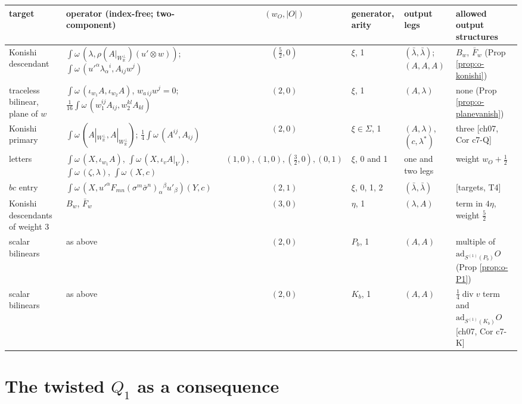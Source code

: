 \begin{tabular}{l|l|c|l|l|l}
target & operator (index-free; two-component) & $(w_O,|O|)$ & generator, arity & output legs & allowed output structures \\
\hline
Konishi descendant & $\int\omega\,(\lambda,\rho(A|_{W_{\mathbb R}^\perp})(u'\otimes w))$; $\int\omega\,(u'^\alpha\lambda_\alpha{}^i,A_{ij}w^j)$ & $(\tfrac52,0)$ & $\xi$, 1 & $(\bar\lambda,\bar\lambda)$; $(A,A,A)$ & $B_w$, $\bar F_w$ (Prop \ref{prop:o-konishi}) \\
traceless bilinear, plane of $w$ & $\int\omega\,(\iota_{w_1}A,\iota_{w_2}A)$, $w_{a\,ij}w^j=0$; $\tfrac1{16}\int\omega\,(w_1^{ij}A_{ij},w_2^{kl}A_{kl})$ & $(2,0)$ & $\xi$, 1 & $(A,\lambda)$ & none (Prop \ref{prop:o-planevanish}) \\
Konishi primary & $\int\omega\,(A|_{W_{\mathbb R}^\perp},A|_{W_{\mathbb R}^\perp})$; $\tfrac14\int\omega\,(A^{ij},A_{ij})$ & $(2,0)$ & $\xi\in\Sigma$, 1 & $(A,\lambda)$, $(c,\lambda^*)$ & three [ch07, Cor c7-Q] \\
letters & $\int\omega\,(X,\iota_{w_1}A)$, $\int\omega\,(X,\iota_vA|_V)$, $\int\omega\,(\zeta,\lambda)$, $\int\omega\,(X,c)$ & $(1,0),(1,0),(\tfrac32,0),(0,1)$ & $\xi$, 0 and 1 & one and two legs & weight $w_O+\tfrac12$ \\
$bc$ entry & $\int\omega\,(X,u'^\alpha F_{mn}(\sigma^m\bar\sigma^n)_\alpha{}^\beta u'_\beta)(Y,c)$ & $(2,1)$ & $\xi$, 0, 1, 2 & $(\bar\lambda,\bar\lambda)$ & [targets, T4] \\
Konishi descendants of weight 3 & $B_w$, $\bar F_w$ & $(3,0)$ & $\eta$, 1 & $(\lambda,A)$ & term in $4\eta$, weight $\tfrac52$ \\
scalar bilinears & as above & $(2,0)$ & $P_b$, 1 & $(A,A)$ & multiple of $\mathrm{ad}_{S^{(1)}(P_b)}O$ (Prop \ref{prop:o-P1}) \\
scalar bilinears & as above & $(2,0)$ & $K_b$, 1 & $(A,A)$ & $\tfrac14\operatorname{div}v$ term and $\mathrm{ad}_{S^{(1)}(K_b)}O$ [ch07, Cor c7-K] \\
\end{tabular}

\section{The twisted $Q_1$ as a consequence}

